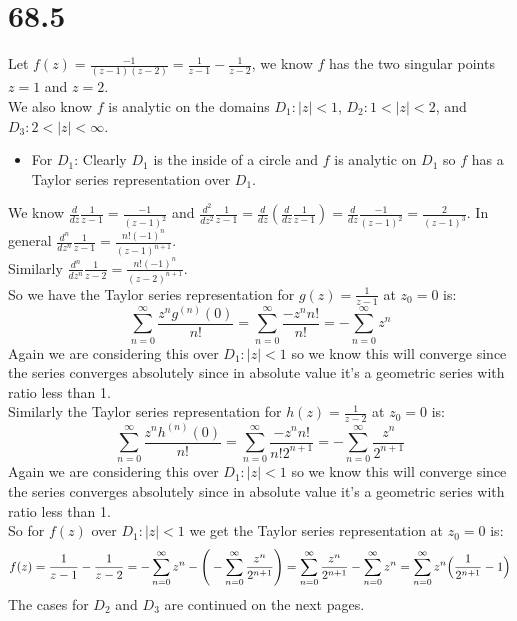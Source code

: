 \documentclass{article}
\begin{document}
\section*{68.5}
\begin{center}
    \doublespacing
    Let $f(z) =\frac{-1}{(z - 1)(z - 2)} =\frac{1}{z - 1} -\frac{1}{z - 2}$, we know $f$ has the two singular points $z = 1$ and $z = 2$.
    \\We also know $f$ is analytic on the domains $D_1: |z| < 1$, $D_2: 1 < |z| < 2$, and $D_3: 2 < |z| <\infty$.
\end{center}
\begin{itemize}
    \item For $D_1$: Clearly $D_1$ is the inside of a circle and $f$ is analytic on $D_1$ so $f$ has a Taylor series representation over $D_1$.
\end{itemize}
\begin{center}
    \doublespacing
    We know $\frac{d}{dz}\frac{1}{z - 1} =\frac{-1}{(z - 1)^2}$ and $\frac{d^2}{dz^2}\frac{1}{z - 1} =\frac{d}{dz} (\frac{d}{dz}\frac{1}{z - 1}) =\frac{d}{dz}\frac{-1}{(z - 1)^2} =\frac{2}{(z - 1)^3}$. In general $\frac{d^n}{dz^n}\frac{1}{z - 1} =\frac{n! (-1)^n}{(z - 1)^{n+1}}$.
    \\Similarly $\frac{d^n}{dz^n}\frac{1}{z - 2} =\frac{n! (-1)^n}{(z - 2)^{n+1}}$.
    \\So we have the Taylor series representation for $g(z) =\frac{1}{z - 1}$ at $z_0 = 0$ is:
    \[\sum _{n=0}^{\infty}\frac{z^n g^{(n)} (0)}{n!} =\sum _{n=0}^{\infty}\frac{-z^n n!}{n!} = -\sum _{n=0}^{\infty} z^n\]
    Again we are considering this over $D_1: |z| < 1$ so we know this will converge since the series converges absolutely since in absolute value it's a geometric series with ratio less than 1.
    \\Similarly the Taylor series representation for $h(z) =\frac{1}{z - 2}$ at $z_0 = 0$ is:
    \[\sum _{n=0}^{\infty}\frac{z^n h^{(n)} (0)}{n!} =\sum _{n=0}^{\infty}\frac{-z^n n!}{n! 2^{n+1}} = -\sum _{n=0}^{\infty}\frac{z^n}{2^{n+1}}\]
    Again we are considering this over $D_1: |z| < 1$ so we know this will converge since the series converges absolutely since in absolute value it's a geometric series with ratio less than 1.
    \\So for $f(z)$ over $D_1: |z| < 1$ we get the Taylor series representation at $z_0 = 0$ is:
    \[f(z) =\frac{1}{z - 1} -\frac{1}{z - 2} = -\sum _{n=0}^{\infty} z^n -\Bigg{(}-\sum _{n=0}^{\infty}\frac{z^n}{2^{n+1}}\Bigg{)} =\sum _{n=0}^{\infty}\frac{z^n}{2^{n+1}} -\sum _{n=0}^{\infty} z^n =\sum _{n=0}^{\infty} z^n\Big{(}\frac{1}{2^{n+1}} - 1\Big{)}\]
    \break
    \newline\newline\newline\newline\newline
    The cases for $D_2$ and $D_3$ are continued on the next pages.
\end{center}
\end{document}

